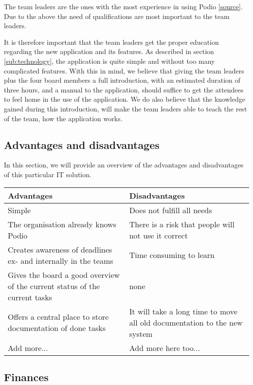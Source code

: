 The team leaders are the ones with the most experience in using Podio \ref{source}. Due to the above
the need of qualifications are most important to the team leaders. 

It is therefore important that the team leaders get the proper education regarding the new
application and its features. As described in section \ref{sub:technology}, the application is quite
simple and without too many complicated features. With this in mind, we believe that giving the team
leaders plus the four board members a full introduction, with an estimated duration of three hours,
and a manual to the application, should suffice to get the attendees to feel home in the use of the
application. We do also believe that the knowledge gained during this introduction, will make the
team leaders able to teach the rest of the team, how the application works.

\subsection{Advantages and disadvantages}
\label{sec:advantages_disadvantages}
In this section, we will provide an overview of the advantages and disadvantages of this particular
IT solution.


\begin{center}
    \begin{tabular}{ | p{7cm} | p{7cm} |}
    \hline
    \textbf{Advantages} & \textbf{Disadvantages}  \\ \hline
    Simple & Does not fulfill all needs  \\ \hline
    The organisation already knows Podio & There is a risk that people will not use it correct \\
    \hline
    Creates awareness of deadlines ex- and internally in the teams & Time consuming to learn \\ \hline
    Gives the board a good overview of the current status of the current tasks & none \\ \hline
    Offers a central place to store documentation of done tasks & It will take a long time to move
    all old documentation to the new system \\ \hline
    Add more... & Add more here too... \\ 
    \hline
    \end{tabular}
\end{center}


\subsection{Finances}

